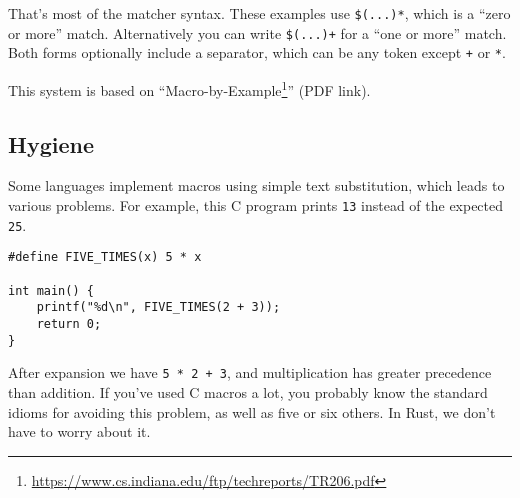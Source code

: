 \documentclass[a4paper,]{book}
\newenvironment{Shaded}{\begin{snugshade}}{\end{snugshade}}
\newcommand{\KeywordTok}[1]{\textcolor[rgb]{0.13,0.29,0.53}{\textbf{{#1}}}}
\newcommand{\DataTypeTok}[1]{\textcolor[rgb]{0.13,0.29,0.53}{{#1}}}
\newcommand{\DecValTok}[1]{\textcolor[rgb]{0.00,0.00,0.81}{{#1}}}
\newcommand{\PreprocessorTok}[1]{\textcolor[rgb]{0.56,0.35,0.01}{\textit{{#1}}}}
\newcommand{\NormalTok}[1]{{#1}}
\renewcommand{\href}[2]{#2\footnote{\url{#1}}}
\begin{document}
\begin{Shaded}
\end{Shaded}

That's most of the matcher syntax. These examples use \texttt{\$(...)*},
which is a ``zero or more'' match. Alternatively you can write
\texttt{\$(...)+} for a ``one or more'' match. Both forms optionally
include a separator, which can be any token except \texttt{+} or
\texttt{*}.

This system is based on
``\href{https://www.cs.indiana.edu/ftp/techreports/TR206.pdf}{Macro-by-Example}''
(PDF link).

\subsection{Hygiene}\label{hygiene}

Some languages implement macros using simple text substitution, which
leads to various problems. For example, this C program prints
\texttt{13} instead of the expected \texttt{25}.

\begin{verbatim}
#define FIVE_TIMES(x) 5 * x

int main() {
    printf("%d\n", FIVE_TIMES(2 + 3));
    return 0;
}
\end{verbatim}

After expansion we have \texttt{5\ *\ 2\ +\ 3}, and multiplication has
greater precedence than addition. If you've used C macros a lot, you
probably know the standard idioms for avoiding this problem, as well as
five or six others. In Rust, we don't have to worry about it.
\end{document}
